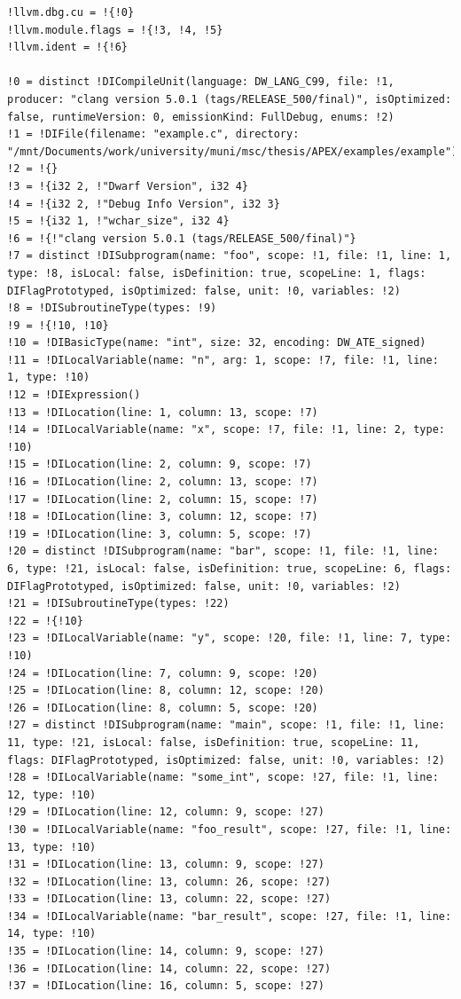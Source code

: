 \documentclass[12pt, twoside]{fithesis2}
\renewcommand{\_}{\leavevmode \kern0.07em\vbox{\hrule width0.4em}}
\begin{document}
\begin{verbatim}
!llvm.dbg.cu = !{!0}
!llvm.module.flags = !{!3, !4, !5}
!llvm.ident = !{!6}

!0 = distinct !DICompileUnit(language: DW_LANG_C99, file: !1, producer: "clang version 5.0.1 (tags/RELEASE_500/final)", isOptimized: false, runtimeVersion: 0, emissionKind: FullDebug, enums: !2)
!1 = !DIFile(filename: "example.c", directory: "/mnt/Documents/work/university/muni/msc/thesis/APEX/examples/example")
!2 = !{}
!3 = !{i32 2, !"Dwarf Version", i32 4}
!4 = !{i32 2, !"Debug Info Version", i32 3}
!5 = !{i32 1, !"wchar_size", i32 4}
!6 = !{!"clang version 5.0.1 (tags/RELEASE_500/final)"}
!7 = distinct !DISubprogram(name: "foo", scope: !1, file: !1, line: 1, type: !8, isLocal: false, isDefinition: true, scopeLine: 1, flags: DIFlagPrototyped, isOptimized: false, unit: !0, variables: !2)
!8 = !DISubroutineType(types: !9)
!9 = !{!10, !10}
!10 = !DIBasicType(name: "int", size: 32, encoding: DW_ATE_signed)
!11 = !DILocalVariable(name: "n", arg: 1, scope: !7, file: !1, line: 1, type: !10)
!12 = !DIExpression()
!13 = !DILocation(line: 1, column: 13, scope: !7)
!14 = !DILocalVariable(name: "x", scope: !7, file: !1, line: 2, type: !10)
!15 = !DILocation(line: 2, column: 9, scope: !7)
!16 = !DILocation(line: 2, column: 13, scope: !7)
!17 = !DILocation(line: 2, column: 15, scope: !7)
!18 = !DILocation(line: 3, column: 12, scope: !7)
!19 = !DILocation(line: 3, column: 5, scope: !7)
!20 = distinct !DISubprogram(name: "bar", scope: !1, file: !1, line: 6, type: !21, isLocal: false, isDefinition: true, scopeLine: 6, flags: DIFlagPrototyped, isOptimized: false, unit: !0, variables: !2)
!21 = !DISubroutineType(types: !22)
!22 = !{!10}
!23 = !DILocalVariable(name: "y", scope: !20, file: !1, line: 7, type: !10)
!24 = !DILocation(line: 7, column: 9, scope: !20)
!25 = !DILocation(line: 8, column: 12, scope: !20)
!26 = !DILocation(line: 8, column: 5, scope: !20)
!27 = distinct !DISubprogram(name: "main", scope: !1, file: !1, line: 11, type: !21, isLocal: false, isDefinition: true, scopeLine: 11, flags: DIFlagPrototyped, isOptimized: false, unit: !0, variables: !2)
!28 = !DILocalVariable(name: "some_int", scope: !27, file: !1, line: 12, type: !10)
!29 = !DILocation(line: 12, column: 9, scope: !27)
!30 = !DILocalVariable(name: "foo_result", scope: !27, file: !1, line: 13, type: !10)
!31 = !DILocation(line: 13, column: 9, scope: !27)
!32 = !DILocation(line: 13, column: 26, scope: !27)
!33 = !DILocation(line: 13, column: 22, scope: !27)
!34 = !DILocalVariable(name: "bar_result", scope: !27, file: !1, line: 14, type: !10)
!35 = !DILocation(line: 14, column: 9, scope: !27)
!36 = !DILocation(line: 14, column: 22, scope: !27)
!37 = !DILocation(line: 16, column: 5, scope: !27)
\end{verbatim}
\end{document}
